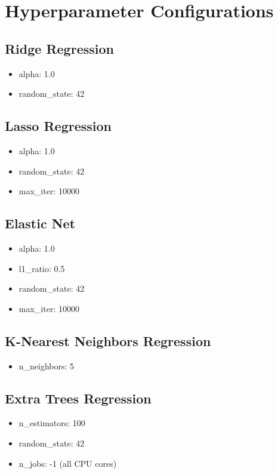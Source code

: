 \section{Hyperparameter Configurations}

\subsection{Ridge Regression}
\begin{itemize}
    \item alpha: 1.0
    \item random\_state: 42
\end{itemize}

\subsection{Lasso Regression}
\begin{itemize}
    \item alpha: 1.0
    \item random\_state: 42
    \item max\_iter: 10000
\end{itemize}

\subsection{Elastic Net}
\begin{itemize}
    \item alpha: 1.0
    \item l1\_ratio: 0.5
    \item random\_state: 42
    \item max\_iter: 10000
\end{itemize}

\subsection{K-Nearest Neighbors Regression}
\begin{itemize}
    \item n\_neighbors: 5
\end{itemize}

\subsection{Extra Trees Regression}
\begin{itemize}
    \item n\_estimators: 100
    \item random\_state: 42
    \item n\_jobs: -1 (all CPU cores)
\end{itemize}

